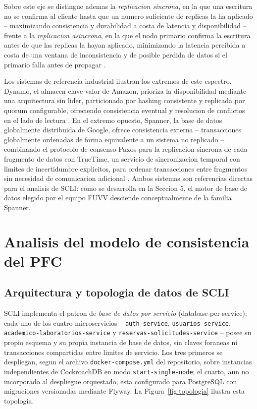 \documentclass[11pt,a4paper]{article}
\begin{document}
Sobre este eje se distingue ademas la \emph{replicacion sincrona}, en la que una escritura no se confirma al cliente hasta que un numero suficiente de replicas la ha aplicado -- maximizando consistencia y durabilidad a costa de latencia y disponibilidad -- frente a la \emph{replicacion asincrona}, en la que el nodo primario confirma la escritura antes de que las replicas la hayan aplicado, minimizando la latencia percibida a costa de una ventana de inconsistencia y de posible perdida de datos si el primario falla antes de propagar \cite{vansteen2017}.

Los sistemas de referencia industrial ilustran los extremos de este espectro. Dynamo, el almacen clave-valor de Amazon, prioriza la disponibilidad mediante una arquitectura sin lider, particionada por hashing consistente y replicada por quorum configurable, ofreciendo consistencia eventual y resolucion de conflictos en el lado de lectura \cite{decandia2007}. En el extremo opuesto, Spanner, la base de datos globalmente distribuida de Google, ofrece consistencia externa -- transacciones globalmente ordenadas de forma equivalente a un sistema no replicado -- combinando el protocolo de consenso Paxos para la replicacion sincrona de cada fragmento de datos con TrueTime, un servicio de sincronizacion temporal con limites de incertidumbre explicitos, para ordenar transacciones entre fragmentos sin necesidad de comunicacion adicional \cite{corbett2013}. Ambos sistemas son referencias directas para el analisis de SCLI: como se desarrolla en la Seccion 5, el motor de base de datos elegido por el equipo FUVV desciende conceptualmente de la familia Spanner.

\section{Analisis del modelo de consistencia del PFC}

\subsection{Arquitectura y topologia de datos de SCLI}

SCLI implementa el patron de \emph{base de datos por servicio} (database-per-service): cada uno de los cuatro microservicios -- \texttt{auth-service}, \texttt{usuarios-service}, \texttt{academico-laboratorios-service} y \texttt{reservas-solicitudes-service} -- posee su propio esquema y su propia instancia de base de datos, sin claves foraneas ni transacciones compartidas entre limites de servicio. Los tres primeros se despliegan, segun el archivo \texttt{docker-compose.yml} del repositorio, sobre instancias independientes de CockroachDB en modo \texttt{start-single-node}; el cuarto, aun no incorporado al despliegue orquestado, esta configurado para PostgreSQL con migraciones versionadas mediante Flyway. La Figura~\ref{fig:topologia} ilustra esta topologia.
\end{document}
